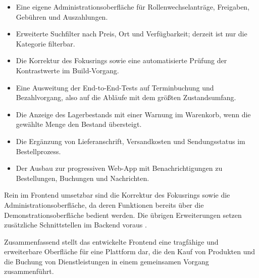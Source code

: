 \begin{itemize}
  \item Eine eigene Administrationsoberfläche für Rollenwechselanträge,
    Freigaben, Gebühren und Auszahlungen.
  \item Erweiterte Suchfilter nach Preis, Ort und Verfügbarkeit;
    derzeit ist nur die Kategorie filterbar.
  \item Die Korrektur des Fokusrings sowie eine automatisierte Prüfung
    der Kontrastwerte im Build-Vorgang.
  \item Eine Ausweitung der End-to-End-Tests auf Terminbuchung und
    Bezahlvorgang, also auf die Abläufe mit dem größten
    Zustandsumfang.
  \item Die Anzeige des Lagerbestands mit einer Warnung im Warenkorb,
    wenn die gewählte Menge den Bestand übersteigt.
  \item Die Ergänzung von Lieferanschrift, Versandkosten und
    Sendungsstatus im Bestellprozess.
  \item Der Ausbau zur progressiven Web-App mit Benachrichtigungen zu
    Bestellungen, Buchungen und Nachrichten.
\end{itemize}

Rein im Frontend umsetzbar sind die Korrektur des Fokusrings sowie die
Administrationsoberfläche, da deren Funktionen bereits über die
Demonstrationsoberfläche bedient werden. Die übrigen Erweiterungen
setzen zusätzliche Schnittstellen im Backend voraus
\cite{alaatki_backend}.

Zusammenfassend stellt das entwickelte Frontend eine tragfähige und
erweiterbare Oberfläche für eine Plattform dar, die den Kauf von
Produkten und die Buchung von Dienstleistungen in einem gemeinsamen
Vorgang zusammenführt.